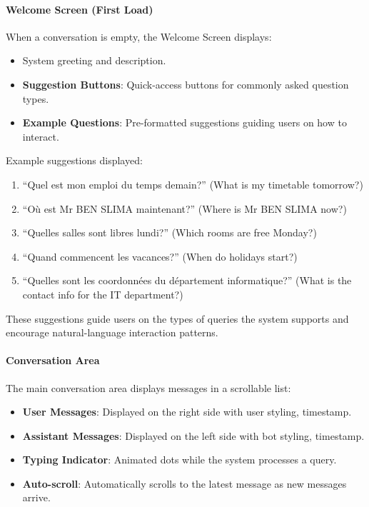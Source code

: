 \paragraph{Welcome Screen (First Load)}
When a conversation is empty, the Welcome Screen displays:

\begin{itemize}
    \item System greeting and description.
    \item \textbf{Suggestion Buttons}: Quick-access buttons for commonly asked question types.
    \item \textbf{Example Questions}: Pre-formatted suggestions guiding users on how to interact.
\end{itemize}

Example suggestions displayed:

\begin{enumerate}
    \item ``Quel est mon emploi du temps demain?'' (What is my timetable tomorrow?)
    \item ``Où est Mr BEN SLIMA maintenant?'' (Where is Mr BEN SLIMA now?)
    \item ``Quelles salles sont libres lundi?'' (Which rooms are free Monday?)
    \item ``Quand commencent les vacances?'' (When do holidays start?)
    \item ``Quelles sont les coordonnées du département informatique?'' (What is the contact info for the IT department?)
\end{enumerate}

These suggestions guide users on the types of queries the system supports and encourage natural-language interaction patterns.

\paragraph{Conversation Area}
The main conversation area displays messages in a scrollable list:

\begin{itemize}
    \item \textbf{User Messages}: Displayed on the right side with user styling, timestamp.
    \item \textbf{Assistant Messages}: Displayed on the left side with bot styling, timestamp.
    \item \textbf{Typing Indicator}: Animated dots while the system processes a query.
    \item \textbf{Auto-scroll}: Automatically scrolls to the latest message as new messages arrive.
\end{itemize}

